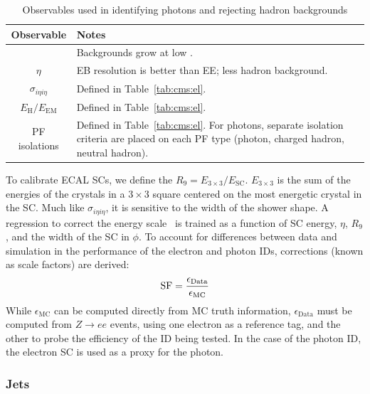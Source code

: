 \begin{table}
	\begin{center}
		\caption{Observables used in identifying photons and rejecting hadron backgrounds}
		\label{tab:cms:pho}
		\begin{tabular}{c|p{}}
			Observable & Notes \\ 
			\hline
			\hline
			\pt & Backgrounds grow at low \pt. \\ \hline
			$\eta$ & EB resolution is better than EE; less hadron background. \\ \hline
			$\sigma_{i\eta i\eta}$  & Defined in Table~\ref{tab:cms:el}. \\ \hline
			$E_\mathrm{H}/E_\mathrm{EM}$  & Defined in Table~\ref{tab:cms:el}. \\ \hline
			PF isolations & Defined in Table~\ref{tab:cms:el}. For photons, separate isolation criteria are placed on each PF type (photon, charged hadron, neutral hadron). \\ 
		\end{tabular}
	\end{center}
\end{table}

To calibrate ECAL SCs, we define the $R_9 = E_{3\times3}/E_\mathrm{SC}$. 
$E_{3\times3}$ is the sum of the energies of the crystals in a $3\times3$ square centered on the most energetic crystal in the SC. 
Much like $\sigma_{i\eta i\eta}$, it is sensitive to the width of the shower shape.
A regression to correct the energy scale~\cite{cmsecalreco} is trained as a function of SC energy, $\eta$, $R_9$, and the width of the SC in $\phi$.
To account for differences between data and simulation in the performance of the electron and photon IDs, corrections (known as scale factors) are derived:
\begin{equation}
	\mathrm{SF} = \frac{\epsilon_\mathrm{Data}}{\epsilon_\mathrm{MC}}
\end{equation}
While $\epsilon_\mathrm{MC}$ can be computed directly from MC truth information, $\epsilon_\mathrm{Data}$ must be computed from $Z\rightarrow ee$ events, using one electron as a reference tag, and the other to probe the efficiency of the ID being tested.
In the case of the photon ID, the electron SC is used as a proxy for the photon.

\subsubsection{Jets}
\label{sec:cms:jets}

